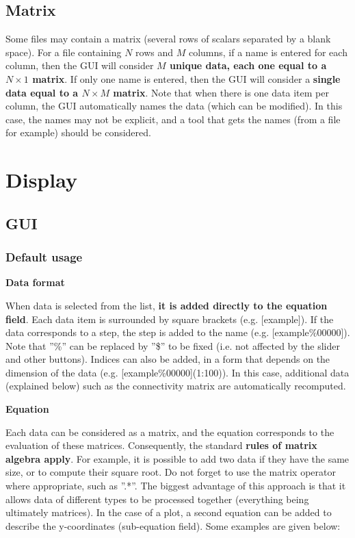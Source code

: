 \documentclass{article}
\begin{document}
\subsection{Matrix}

Some files may contain a matrix (several rows of scalars separated by a blank space). For a file containing $N$ rows and $M$ columns, if a name is entered for each column, then the GUI will consider \textbf{$M$ unique data, each one equal to a $N \times 1$ matrix}. If only one name is entered, then the GUI will consider a \textbf{single data equal to a $N \times M$ matrix}. Note that when there is one data item per column, the GUI automatically names the data (which can be modified). In this case, the names may not be explicit, and a tool that gets the names (from a file for example) should be considered.

\section{Display}

\subsection{GUI}

\subsubsection{Default usage}

\textbf{Data format} \newline

\par
When data is selected from the list, \textbf{it is added directly to the equation field}. Each data item is surrounded by square brackets (e.g. [example]). If the data corresponds to a step, the step is added to the name (e.g. [example\%00000]). Note that ''\%'' can be replaced by ''\$'' to be fixed (i.e. not affected by the slider and other buttons). Indices can also be added, in a form that depends on the dimension of the data (e.g. [example\%00000](1:100)). In this case, additional data (explained below) such as the connectivity matrix are automatically recomputed.
\newline

\textbf{Equation}\newline
\par
Each data can be considered as a matrix, and the equation corresponds to the evaluation of these matrices. Consequently, the standard \textbf{rules of matrix algebra apply}. For example, it is possible to add two data if they have the same size, or to compute their square root. Do not forget to use the matrix operator where appropriate, such as ''.*''. The biggest advantage of this approach is that it allows data of different types to be processed together (everything being ultimately matrices). In the case of a plot, a second equation can be added to describe the y-coordinates (sub-equation field). Some examples are given below:
\end{document}
